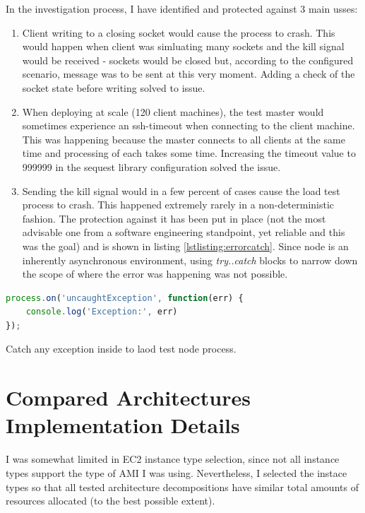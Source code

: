 \documentclass{uvamscse}
\begin{document}
In the investigation process, I have identified and protected against 3 main usses:

\begin{enumerate}
  \item Client writing to a closing socket would cause the process to crash. This would happen when client was simluating many sockets and the kill signal would be received - sockets would be closed but, according to the configured scenario, message was to be sent at this very moment. Adding a check of the socket state before writing solved to issue.
  \item When deploying at scale (120 client machines), the test master would sometimes experience an ssh-timeout when connecting to the client machine. This was happening because the master connects to all clients at the same time and processing of each takes some time. Increasing the timeout value to 999999 in the sequest library configuration solved the issue.
  \item Sending the kill signal would in a few percent of cases cause the load test process to crash. This happened extremely rarely in a non-deterministic fashion. The protection against it has been put in place (not the most advisable one from a software engineering standpoint, yet reliable and this was the goal) and is shown in listing \ref{lstlisting:errorcatch}. Since node is an inherently asynchronous environment, using \textit{try..catch} blocks to narrow down the scope of where the error was happening was not possible.
\end{enumerate}

\begin{sourcecode}[H]
\begin{lstlisting}[language=javascript]
process.on('uncaughtException', function(err) {
    console.log('Exception:', err)
});
\end{lstlisting}
\caption{Catch any exception inside to laod test node process.}
\label{lstlisting:errorcatch}
\end{sourcecode}

\section{Compared Architectures Implementation Details}\label{Compared Architectures Implementation Details}

I was somewhat limited in EC2 instance type selection, since not all instance types support the type of AMI I was using. Nevertheless, I selected the instace types so that all tested architecture decompositions have similar total amounts of resources allocated (to the best possible extent).
\end{document}

